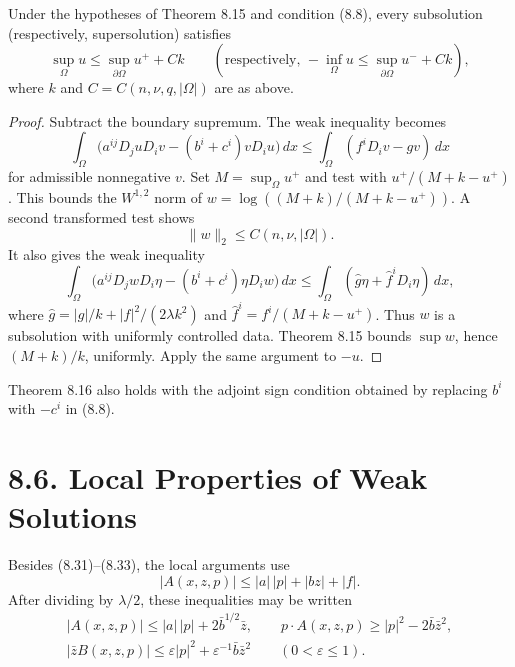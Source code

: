 \begin{theorem}
\label{gt-thm-8-16-global-apriori-bound}
Under the hypotheses of Theorem 8.15 and condition (8.8), every subsolution
(respectively, supersolution) satisfies
\begin{equation}
\sup_\Omega u\leq\sup_{\partial\Omega}u^++Ck
\qquad
\left(\text{respectively, }-\inf_\Omega u\leq
\sup_{\partial\Omega}u^-+Ck\right),
\tag{8.39}
\end{equation}
where $k$ and $C=C(n,\nu,q,|\Omega|)$ are as above.
\end{theorem}
\begin{proof}
\sketch Subtract the boundary supremum. The weak inequality becomes
\begin{equation}
\tag{8.40}
\int_\Omega\bigl(a^{ij}D_j uD_i v-(b^i+c^i)vD_i u\bigr)\,dx
\leq\int_\Omega(f^iD_i v-gv)\,dx
\end{equation}
for admissible nonnegative $v$. Set $M=\sup_\Omega u^+$ and test with
$u^+/(M+k-u^+)$. This bounds the
$W^{1,2}$ norm of $w=\log((M+k)/(M+k-u^+))$. A second transformed test shows
\begin{equation}
\tag{8.41}
\|w\|_2\leq C(n,\nu,|\Omega|).
\end{equation}
It also gives the weak inequality
\begin{equation}
\tag{8.42}
\int_\Omega\bigl(a^{ij}D_jwD_i\eta-(b^i+c^i)\eta D_iw\bigr)\,dx
\leq\int_\Omega(\widehat g\eta+\widehat f^iD_i\eta)\,dx,
\end{equation}
where
$\widehat g=|g|/k+|f|^2/(2\lambda k^2)$ and
$\widehat f^i=f^i/(M+k-u^+)$. Thus $w$ is a subsolution with uniformly
controlled data.
Theorem 8.15 bounds
$\sup w$, hence $(M+k)/k$, uniformly. Apply the same argument to $-u$.
\end{proof}

\begin{remark}
\label{gt-rem-8-adjoint-sign-maximum-bound}
Theorem 8.16 also holds with the adjoint sign condition obtained by replacing
$b^i$ with $-c^i$ in (8.8).
\end{remark}

\section*{8.6. Local Properties of Weak Solutions}

Besides (8.31)--(8.33), the local arguments use
\begin{equation}
|A(x,z,p)|\leq|a|\,|p|+|bz|+|f|.
\tag{8.43}
\end{equation}
After dividing by $\lambda/2$, these inequalities may be written
\begin{equation}
\begin{gathered}
|A(x,z,p)|\leq|a|\,|p|+2\bar b^{1/2}\bar z,
\qquad p\cdot A(x,z,p)\geq|p|^2-2\bar b\bar z^2,\\
|\bar zB(x,z,p)|\leq\varepsilon|p|^2
+\varepsilon^{-1}\bar b\bar z^2
\qquad(0<\varepsilon\leq1).
\end{gathered}
\tag{8.44}
\end{equation}

